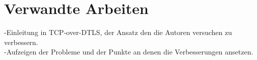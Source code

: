 \section{Verwandte Arbeiten}

-Einleitung in TCP-over-DTLS, der Ansatz den die Autoren versuchen zu verbessern. \\
-Aufzeigen der Probleme und der Punkte an denen die Verbesserungen ansetzen.\\